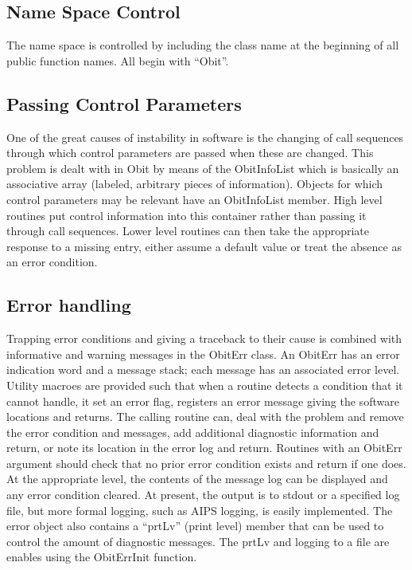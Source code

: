 \documentclass[11pt]{article}
\begin{document}
\subsection{Name Space Control}
The name space is controlled by including the class name at the
beginning of all public function names.
All begin with ``Obit''.

\subsection{Passing Control Parameters}
One of the great causes of instability in software is the changing of
call sequences through which control parameters are passed when these
are changed.
This problem is dealt with in Obit by means of the ObitInfoList which
is basically an associative array (labeled, arbitrary pieces of
information). 
Objects for which control parameters may be relevant have an
ObitInfoList member.
High level routines put control information into this container rather
than passing it through call sequences. 
Lower level routines can then take the appropriate response to a
missing entry, either assume a default value or treat the absence as
an error condition. 

\subsection{Error handling}
Trapping error conditions and giving a traceback to their cause is
combined with informative and warning messages in the ObitErr class.
An ObitErr has an error indication word and a message stack; each
message has an associated error level.
Utility macroes are provided such that when a routine detects a
condition that it cannot handle, it set an error flag, registers an
error message giving the software locations and returns.  
The calling routine can, deal with the problem and remove the error
condition and messages, add additional diagnostic information and
return, or note its location in the error log and return.
Routines with an ObitErr argument should check that no prior error
condition exists and return if one does.
At the appropriate level, the contents of the message log can be
displayed and any error condition cleared.
At present, the output is to stdout or a specified log file, but more
formal logging, such as AIPS logging, is easily implemented.
The error object also contains a ``prtLv'' (print level) member that
can be used to control the amount of diagnostic messages.
The prtLv and logging to a file are enables using the ObitErrInit
function.
\end{document}
